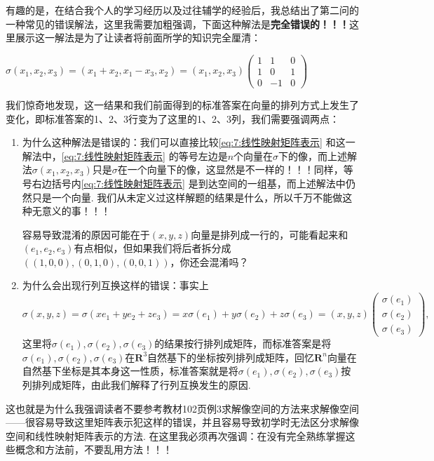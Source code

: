 有趣的是，在结合我个人的学习经历以及过往辅学的经验后，我总结出了第二问的一种常见的错误解法，这里我需要加粗强调，下面这种解法是\textbf{完全错误的！！！}这里展示这一解法是为了让读者将前面所学的知识完全厘清：

\begin{solution}[错误解法！！！]
    $\sigma(x_1,x_2,x_3)=(x_1+x_2,x_1-x_3, x_2)=(x_1,x_2,x_3)\begin{pmatrix}
            1 & 1  & 0 \\
            1 & 0  & 1 \\
            0 & -1 & 0
        \end{pmatrix}$
\end{solution}

我们惊奇地发现，这一结果和我们前面得到的标准答案在向量的排列方式上发生了变化，即标准答案的1、2、3行变为了这里的1、2、3列，我们需要强调两点：
\begin{enumerate}
    \item 为什么这种解法是错误的：我们可以直接比较\autoref{eq:7:线性映射矩阵表示} 和这一解法中，\autoref*{eq:7:线性映射矩阵表示} 的等号左边是$n$个向量在$\sigma$下的像，而上述解法$\sigma(x_1,x_2,x_3)$只是$\sigma$在一个向量下的像，这显然是不一样的！！！同样，等号右边括号内\autoref*{eq:7:线性映射矩阵表示} 是到达空间的一组基，而上述解法中仍然只是一个向量. 我们从未定义过这样解题的结果是什么，所以千万不能做这种无意义的事！！！

          容易导致混淆的原因可能在于$(x,y,z)$向量是排列成一行的，可能看起来和$(e_1,e_2,e_3)$有点相似，但如果我们将后者拆分成$((1,0,0),(0,1,0),(0,0,1))$，你还会混淆吗？

    \item 为什么会出现行列互换这样的错误：事实上
          \[\sigma(x,y,z)=\sigma(xe_1+ye_2+ze_3)=x\sigma(e_1)+y\sigma(e_2)+z\sigma(e_3)=(x,y,z)\begin{pmatrix}
                  \sigma(e_1) \\ \sigma(e_2) \\ \sigma(e_3)
              \end{pmatrix},\]
          这里将$\sigma(e_1),\sigma(e_2),\sigma(e_3)$的结果按行排列成矩阵，而标准答案是将$\sigma(e_1),\sigma(e_2),\sigma(e_3)$在$\mathbf{R}^3$自然基下的坐标按列排列成矩阵，回忆$\mathbf{R}^n$向量在自然基下坐标是其本身这一性质，标准答案就是将$\sigma(e_1),\sigma(e_2),\sigma(e_3)$按列排列成矩阵，由此我们解释了行列互换发生的原因.
\end{enumerate}

这也就是为什么我强调读者不要参考教材102页例3求解像空间的方法来求解像空间——很容易导致这里矩阵表示犯这样的错误，并且容易导致初学时无法区分求解像空间和线性映射矩阵表示的方法. 在这里我必须再次强调：在没有完全熟练掌握这些概念和方法前，不要乱用方法！！！

